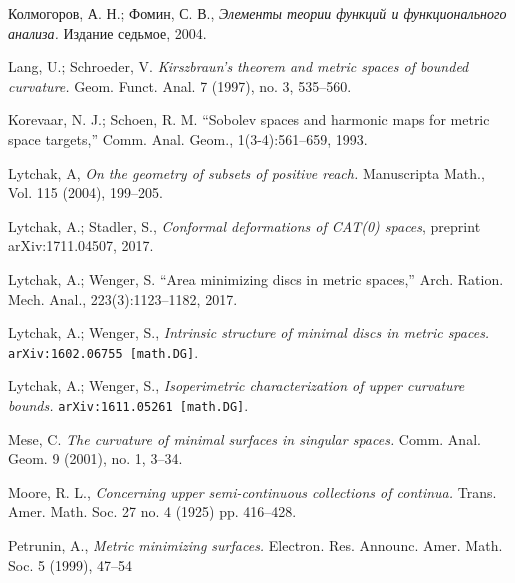 \documentclass{article}
\begin{document}
\begin{thebibliography}{52}

\begin{otherlanguage}{russian}
Колмогоров, А. Н.;
Фомин, С. В.,
\textit{Элементы теории функций и функционального анализа.}
Издание седьмое, 2004.
\end{otherlanguage}





 Lang, U.; Schroeder, V.
\textit{Kirszbraun's theorem and metric spaces of bounded curvature.}
Geom. Funct. Anal. 7 (1997), no. 3, 535--560. 

Korevaar, N. J.; Schoen, R. M. ``Sobolev spaces and harmonic maps for metric space targets,'' Comm. Anal. Geom., 1(3-4):561--659, 1993.

 Lytchak, A, 
\textit{On the geometry of subsets of positive reach.} 
Manuscripta Math., Vol. 115 (2004), 199--205. 


 Lytchak, A.; Stadler, S.,  \textit{Conformal deformations of CAT(0) spaces}, preprint arXiv:1711.04507, 2017.


Lytchak, A.; Wenger, S. ``Area minimizing discs in metric spaces,'' Arch. Ration. Mech. Anal., 223(3):1123--1182, 2017.


Lytchak, A.; Wenger, S.,
\textit{Intrinsic structure of minimal discs in metric spaces.} 
\texttt{arXiv:1602.06755 [math.DG]}.


 Lytchak, A.; Wenger, S.,  
\textit{Isoperimetric  characterization  of  upper  curvature bounds.}
\texttt{arXiv:1611.05261 [math.DG]}.

 Mese, C.
\textit{The curvature of minimal surfaces in singular spaces.}
Comm. Anal. Geom. 9 (2001), no. 1, 3--34. 

Moore, R. L.,
\textit{Concerning upper semi-continuous collections of continua.}
Trans. Amer. Math. Soc. 27 no. 4 (1925) pp. 416--428.

 Petrunin, A.,
\textit{Metric minimizing surfaces.}
Electron. Res. Announc. Amer. Math. Soc. 5 (1999), 47--54 


\end{thebibliography}
\end{document}
